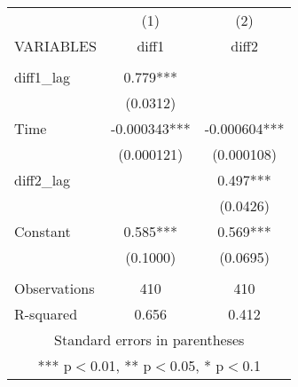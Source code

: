 \documentclass[]{article}
\begin{document}
\begin{tabular}{lcc} \hline
 & (1) & (2) \\
VARIABLES & diff1 & diff2 \\ \hline
 &  &  \\
diff1\_lag & 0.779*** &  \\
 & (0.0312) &  \\
Time & -0.000343*** & -0.000604*** \\
 & (0.000121) & (0.000108) \\
diff2\_lag &  & 0.497*** \\
 &  & (0.0426) \\
Constant & 0.585*** & 0.569*** \\
 & (0.1000) & (0.0695) \\
 &  &  \\
Observations & 410 & 410 \\
 R-squared & 0.656 & 0.412 \\ \hline
\multicolumn{3}{c}{ Standard errors in parentheses} \\
\multicolumn{3}{c}{ *** p$<$0.01, ** p$<$0.05, * p$<$0.1} \\
\end{tabular}
\end{document}
